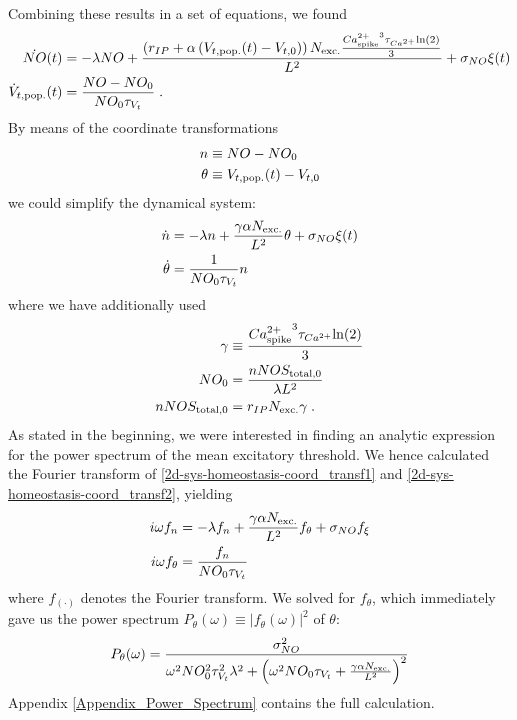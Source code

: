\documentclass[10pt,a4paper]{article}
\begin{document}
Combining these results in a set of equations, we found
\begin{align}
\dot{NO}(t) &= -\lambda NO + \frac{ \left( r_{IP} + \alpha \left( V_{t,\rm pop.}(t)-V_{t,0} \right) \right)  N_{\rm exc.}\frac{{Ca^{2+}_{\rm spike}}^3 \tau_{Ca^{2+}} \mathrm{ln} (2)}{3}}{L^2} + \sigma_{NO} \xi(t) \label{2d-sys-homeostasis1}\\
\dot{V}_{t,\rm pop.}(t) &= \frac{NO-NO_0}{NO_0 \tau_{V_t}}\;. \label{2d-sys-homeostasis2}
\end{align}
By means of the coordinate transformations
\begin{align}
n &\equiv NO-NO_0 \label{simplif_coord_transf1}\\
\theta &\equiv V_{t,\rm pop.}(t)-V_{t,0} \label{simplif_coord_transf2}
\end{align}
we could simplify the dynamical system:
\begin{align}
\dot{n} &= -\lambda n + \frac{\gamma \alpha N_{\rm exc.}}{L^2}\theta + \sigma_{NO} \xi(t) \label{2d-sys-homeostasis-coord_transf1}\\
\dot{\theta} &= \frac{1}{NO_0 \tau_{V_t}} n \label{2d-sys-homeostasis-coord_transf2}
\end{align}
where we have additionally used
\begin{align}
\gamma &\equiv \frac{{Ca^{2+}_{\rm spike}}^3 \tau_{Ca^{2+}} \mathrm{ln} (2)}{3} \label{2d-sys-fixed-points1}\\
NO_0 &= \frac{nNOS_{\mathrm{ total},0}}{\lambda L^2} \label{2d-sys-fixed-points2}\\
nNOS_{\mathrm{ total},0} &= r_{IP} N_{\rm exc.} \gamma \; . \label{2d-sys-fixed-points3}
\end{align}
As stated in the beginning, we were interested in finding an analytic expression for the power spectrum of the mean excitatory threshold. We hence calculated the Fourier transform of \eqref{2d-sys-homeostasis-coord_transf1} and \eqref{2d-sys-homeostasis-coord_transf2}, yielding
\begin{align}
i\omega f_n &= - \lambda f_n + \frac{\gamma \alpha N_{\rm exc.}}{L^2}f_\theta + \sigma_{NO} f_{\xi} \label{2d-sys-homeostasis-coord_transf_ft1}\\
i\omega f_\theta &= \frac{f_n}{NO_0\tau_{V_t}} \label{2d-sys-homeostasis-coord_transf_ft2}
\end{align}
where $f_{(\cdot)}$ denotes the Fourier transform. We solved for $f_\theta$, which immediately gave us the power spectrum $P_\theta (\omega) \equiv |f_\theta (\omega)|^2$ of $\theta$:
\begin{equation}
P_\theta (\omega) = \frac{\sigma_{NO}^2}{\omega^2 NO_0^2 \tau_{V_t}^2 \lambda^2 + \left( \omega^2 NO_0 \tau_{V_t} + \frac{\gamma \alpha N_{\rm exc.}}{L^2}\right)^2} \label{Pow_Spec_Theta_Final}
\end{equation}
Appendix \ref{Appendix_Power_Spectrum} contains the full calculation.
\end{document}
